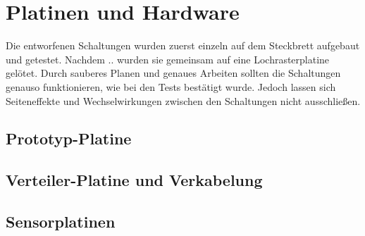 
\chapter{Platinen und Hardware}
Die entworfenen Schaltungen wurden zuerst einzeln auf dem Steckbrett aufgebaut und getestet. Nachdem .. wurden sie gemeinsam auf eine Lochrasterplatine gelötet. Durch sauberes Planen und genaues Arbeiten sollten die Schaltungen genauso funktionieren, wie bei den Tests bestätigt wurde. Jedoch lassen sich Seiteneffekte und Wechselwirkungen zwischen den Schaltungen nicht ausschließen.


\section{Prototyp-Platine}



\section{Verteiler-Platine und Verkabelung}




\section{Sensorplatinen}


